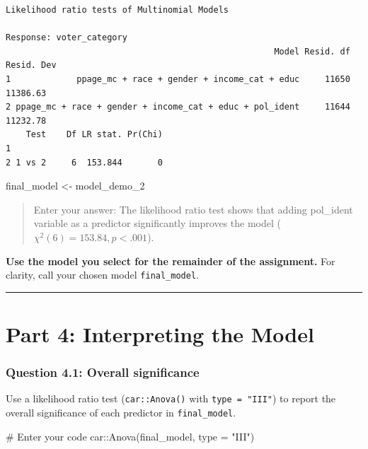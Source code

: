 \documentclass[
  letterpaper,
  DIV=11,
  numbers=noendperiod]{scrartcl}
\newenvironment{Shaded}{\begin{snugshade}}{\end{snugshade}}
\newcommand{\AttributeTok}[1]{\textcolor[rgb]{0.40,0.45,0.13}{#1}}
\newcommand{\CommentTok}[1]{\textcolor[rgb]{0.37,0.37,0.37}{#1}}
\newcommand{\FunctionTok}[1]{\textcolor[rgb]{0.28,0.35,0.67}{#1}}
\newcommand{\NormalTok}[1]{\textcolor[rgb]{0.00,0.23,0.31}{#1}}
\newcommand{\OtherTok}[1]{\textcolor[rgb]{0.00,0.23,0.31}{#1}}
\newcommand{\SpecialCharTok}[1]{\textcolor[rgb]{0.37,0.37,0.37}{#1}}
\newcommand{\StringTok}[1]{\textcolor[rgb]{0.13,0.47,0.30}{#1}}
\begin{document}
\begin{verbatim}
Likelihood ratio tests of Multinomial Models

Response: voter_category
                                                     Model Resid. df Resid. Dev
1             ppage_mc + race + gender + income_cat + educ     11650   11386.63
2 ppage_mc + race + gender + income_cat + educ + pol_ident     11644   11232.78
    Test    Df LR stat. Pr(Chi)
1                              
2 1 vs 2     6  153.844       0
\end{verbatim}

\begin{Shaded}
\begin{Highlighting}[]
\NormalTok{final\_model }\OtherTok{\textless{}{-}}\NormalTok{ model\_demo\_2}
\end{Highlighting}
\end{Shaded}

\begin{quote}
Enter your answer: The likelihood ratio test shows that adding
pol\_ident variable as a predictor significantly improves the model
(\(\chi^2(6) = 153.84, p < .001\)).
\end{quote}

\textbf{Use the model you select for the remainder of the assignment.}
For clarity, call your chosen model \texttt{final\_model}.

\begin{center}\rule{0.5\linewidth}{0.5pt}\end{center}

\section{Part 4: Interpreting the
Model}\label{part-4-interpreting-the-model}

\subsubsection*{Question 4.1: Overall
significance}\label{question-4.1-overall-significance}

Use a likelihood ratio test (\texttt{car::Anova()} with
\texttt{type\ =\ "III"}) to report the overall significance of each
predictor in \texttt{final\_model}.

\begin{Shaded}
\begin{Highlighting}[]
\CommentTok{\# Enter your code}
\NormalTok{car}\SpecialCharTok{::}\FunctionTok{Anova}\NormalTok{(final\_model, }\AttributeTok{type =} \StringTok{"III"}\NormalTok{)}
\end{Highlighting}
\end{Shaded}
\end{document}
